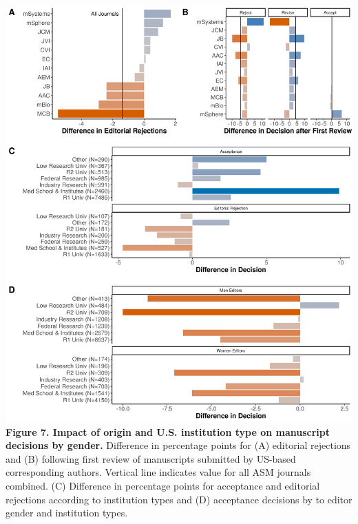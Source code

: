 \documentclass[11pt,]{article}
\begin{document}
\newpage

\includegraphics{Figure_6.png} \textbf{Figure 7. Impact of origin and
U.S. institution type on manuscript decisions by gender.} Difference in
percentage points for (A) editorial rejections and (B) following first
review of manuscripts submitted by US-based corresponding authors.
Vertical line indicates value for all ASM journals combined. (C)
Difference in percentage points for acceptance and editorial rejections
according to institution types and (D) acceptance decisions by to editor
gender and institution types.

\newpage
\end{document}
